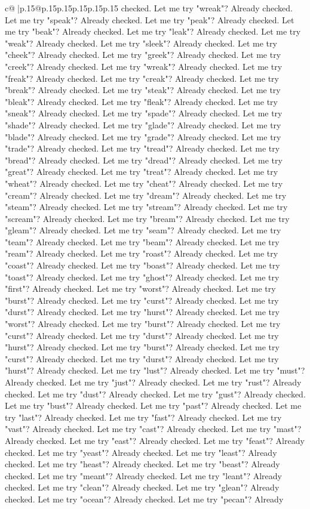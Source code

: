 \documentclass{article}
\begin{document}
{\begin{supertabular}{c@{$\;$}|p{.15\linewidth}@{}p{.15\linewidth}p{.15\linewidth}p{.15\linewidth}p{.15\linewidth}p{.15\linewidth}}
{{{checked. Let me try "wreak"? Already checked. Let me try "speak"? Already checked. Let me try "peak"? Already checked. Let me try "beak"? Already checked. Let me try "leak"? Already checked. Let me try "weak"? Already checked. Let me try "sleek"? Already checked. Let me try "cheek"? Already checked. Let me try "greek"? Already checked. Let me try "creek"? Already checked. Let me try "wreak"? Already checked. Let me try "freak"? Already checked. Let me try "creak"? Already checked. Let me try "break"? Already checked. Let me try "steak"? Already checked. Let me try "bleak"? Already checked. Let me try "fleak"? Already checked. Let me try "sneak"? Already checked. Let me try "spade"? Already checked. Let me try "shade"? Already checked. Let me try "glade"? Already checked. Let me try "blade"? Already checked. Let me try "grade"? Already checked. Let me try "trade"? Already checked. Let me try "tread"? Already checked. Let me try "bread"? Already checked. Let me try "dread"? Already checked. Let me try "great"? Already checked. Let me try "treat"? Already checked. Let me try "wheat"? Already checked. Let me try "cheat"? Already checked. Let me try "cream"? Already checked. Let me try "dream"? Already checked. Let me try "steam"? Already checked. Let me try "stream"? Already checked. Let me try "scream"? Already checked. Let me try "bream"? Already checked. Let me try "gleam"? Already checked. Let me try "seam"? Already checked. Let me try "team"? Already checked. Let me try "beam"? Already checked. Let me try "ream"? Already checked. Let me try "roast"? Already checked. Let me try "coast"? Already checked. Let me try "boast"? Already checked. Let me try "toast"? Already checked. Let me try "ghost"? Already checked. Let me try "first"? Already checked. Let me try "worst"? Already checked. Let me try "burst"? Already checked. Let me try "curst"? Already checked. Let me try "durst"? Already checked. Let me try "hurst"? Already checked. Let me try "worst"? Already checked. Let me try "burst"? Already checked. Let me try "curst"? Already checked. Let me try "durst"? Already checked. Let me try "hurst"? Already checked. Let me try "burst"? Already checked. Let me try "curst"? Already checked. Let me try "durst"? Already checked. Let me try "hurst"? Already checked. Let me try "lust"? Already checked. Let me try "must"? Already checked. Let me try "just"? Already checked. Let me try "rust"? Already checked. Let me try "dust"? Already checked. Let me try "gust"? Already checked. Let me try "bust"? Already checked. Let me try "past"? Already checked. Let me try "last"? Already checked. Let me try "fast"? Already checked. Let me try "vast"? Already checked. Let me try "cast"? Already checked. Let me try "mast"? Already checked. Let me try "east"? Already checked. Let me try "feast"? Already checked. Let me try "yeast"? Already checked. Let me try "least"? Already checked. Let me try "heast"? Already checked. Let me try "beast"? Already checked. Let me try "meant"? Already checked. Let me try "leant"? Already checked. Let me try "clean"? Already checked. Let me try "glean"? Already checked. Let me try "ocean"? Already checked. Let me try "pecan"? Already }}}
\end{supertabular}}
\end{document}
